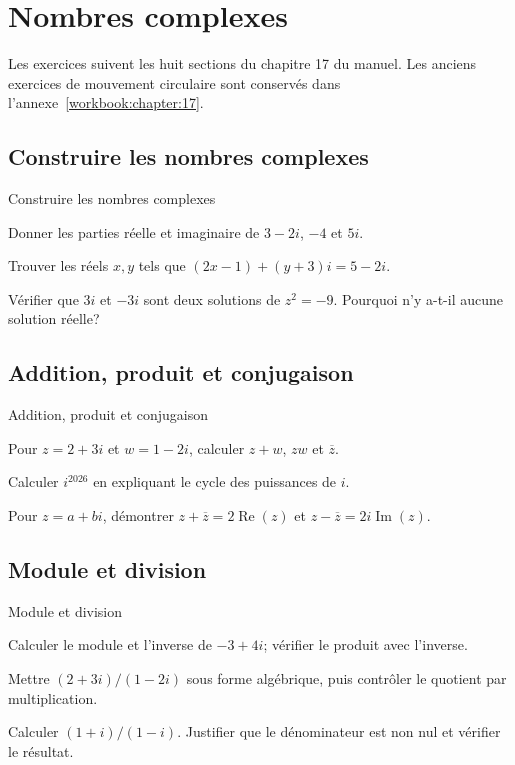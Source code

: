 \chapter{Nombres complexes}
\label{workbook:chapter:complexes}

Les exercices suivent les huit sections du chapitre 17 du manuel. Les anciens exercices de mouvement circulaire sont conservés dans l'annexe~\ref{workbook:chapter:17}.

\section{Construire les nombres complexes}
\label{workbook:section:complexes.01}
\begin{exerciseblock}{Construire les nombres complexes}
\item Donner les parties réelle et imaginaire de $3-2i$, $-4$ et $5i$.
\item Trouver les réels $x,y$ tels que $(2x-1)+(y+3)i=5-2i$.
\item Vérifier que $3i$ et $-3i$ sont deux solutions de $z^2=-9$. Pourquoi n'y a-t-il aucune solution réelle?
\end{exerciseblock}

\section{Addition, produit et conjugaison}
\label{workbook:section:complexes.02}
\begin{exerciseblock}{Addition, produit et conjugaison}
\item Pour $z=2+3i$ et $w=1-2i$, calculer $z+w$, $zw$ et $\overline z$.
\item Calculer $i^{2026}$ en expliquant le cycle des puissances de $i$.
\item Pour $z=a+bi$, démontrer $z+\overline z=2\operatorname{Re}(z)$ et $z-\overline z=2i\operatorname{Im}(z)$.
\end{exerciseblock}

\section{Module et division}
\label{workbook:section:complexes.03}
\begin{exerciseblock}{Module et division}
\item Calculer le module et l'inverse de $-3+4i$; vérifier le produit avec l'inverse.
\item Mettre $(2+3i)/(1-2i)$ sous forme algébrique, puis contrôler le quotient par multiplication.
\item Calculer $(1+i)/(1-i)$. Justifier que le dénominateur est non nul et vérifier le résultat.
\end{exerciseblock}

